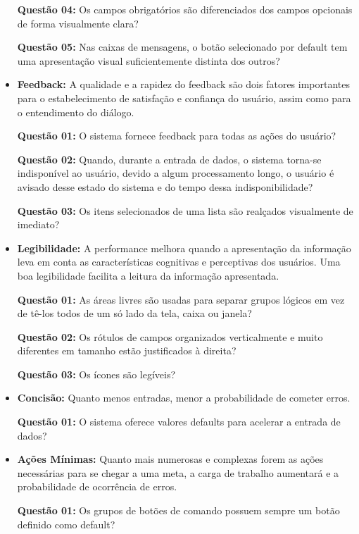 \begin{itemize}
    	\textbf{Questão 04:} Os campos obrigatórios são diferenciados dos campos opcionais de forma visualmente clara? 
	    
	    \textbf{Questão 05:}  Nas caixas de mensagens, o botão selecionado por default tem uma apresentação visual suficientemente distinta dos outros? 

	    \item \textbf{Feedback:} A qualidade e a rapidez do feedback são dois fatores importantes para o estabelecimento de satisfação e confiança do usuário, assim como para o entendimento do diálogo.

    	\textbf{Questão 01:} O sistema fornece feedback para todas as ações do usuário? 
    
    	\textbf{Questão 02:} Quando, durante a entrada de dados, o sistema torna-se indisponível ao usuário, devido a algum processamento longo, o usuário é avisado desse estado do sistema e do tempo dessa indisponibilidade?
    
    	\textbf{Questão 03:} Os itens selecionados de uma lista são realçados visualmente de imediato? 
    
    	\item \textbf{Legibilidade:} A performance melhora quando a apresentação da informação leva em conta as características cognitivas e perceptivas dos usuários. Uma boa legibilidade facilita a leitura da informação apresentada. 

		\textbf{Questão 01:} As áreas livres são usadas para separar grupos lógicos em vez de tê-los todos de um só lado da tela, caixa ou janela?
     	
     	\textbf{Questão 02:} Os rótulos de campos organizados verticalmente e muito diferentes em tamanho estão justificados à direita?
     	
     	\textbf{Questão 03:} Os ícones são legíveis? 
     	
     	\item \textbf{Concisão:} Quanto menos entradas, menor a probabilidade de cometer erros. 

		\textbf{Questão 01:} O sistema oferece valores defaults para acelerar a entrada de dados?

		\item \textbf{Ações Mínimas:} Quanto mais numerosas e complexas forem as ações necessárias para se chegar a uma meta, a carga de trabalho aumentará e  a probabilidade de ocorrência de erros.

		\textbf{Questão 01:} Os grupos de botões de comando possuem sempre um botão definido como default? 


\end{itemize}
